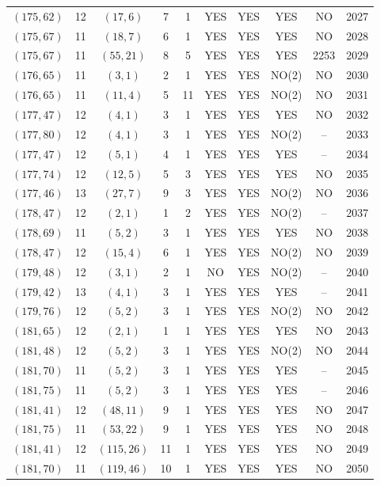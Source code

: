 \begin{longtable}{|c|c|c|c|c|c|c|c|c|c|}
$(175, 62)$ & 12 & $(17, 6)$ & 7 & 1 & YES & YES & YES & NO & 2027\\
$(175, 67)$ & 11 & $(18, 7)$ & 6 & 1 & YES & YES & YES & NO & 2028\\
$(175, 67)$ & 11 & $(55, 21)$ & 8 & 5 & YES & YES & YES & 2253 & 2029\\
$(176, 65)$ & 11 & $(3, 1)$ & 2 & 1 & YES & YES & NO(2) & NO & 2030\\
$(176, 65)$ & 11 & $(11, 4)$ & 5 & 11 & YES & YES & NO(2) & NO & 2031\\
$(177, 47)$ & 12 & $(4, 1)$ & 3 & 1 & YES & YES & YES & NO & 2032\\
$(177, 80)$ & 12 & $(4, 1)$ & 3 & 1 & YES & YES & NO(2) & -- & 2033\\
$(177, 47)$ & 12 & $(5, 1)$ & 4 & 1 & YES & YES & YES & -- & 2034\\
$(177, 74)$ & 12 & $(12, 5)$ & 5 & 3 & YES & YES & YES & NO & 2035\\
$(177, 46)$ & 13 & $(27, 7)$ & 9 & 3 & YES & YES & NO(2) & NO & 2036\\
$(178, 47)$ & 12 & $(2, 1)$ & 1 & 2 & YES & YES & NO(2) & -- & 2037\\
$(178, 69)$ & 11 & $(5, 2)$ & 3 & 1 & YES & YES & YES & NO & 2038\\
$(178, 47)$ & 12 & $(15, 4)$ & 6 & 1 & YES & YES & NO(2) & NO & 2039\\
$(179, 48)$ & 12 & $(3, 1)$ & 2 & 1 & NO & YES & NO(2) & -- & 2040\\
$(179, 42)$ & 13 & $(4, 1)$ & 3 & 1 & YES & YES & YES & -- & 2041\\
$(179, 76)$ & 12 & $(5, 2)$ & 3 & 1 & YES & YES & NO(2) & NO & 2042\\
$(181, 65)$ & 12 & $(2, 1)$ & 1 & 1 & YES & YES & YES & NO & 2043\\
$(181, 48)$ & 12 & $(5, 2)$ & 3 & 1 & YES & YES & NO(2) & NO & 2044\\
$(181, 70)$ & 11 & $(5, 2)$ & 3 & 1 & YES & YES & YES & -- & 2045\\
$(181, 75)$ & 11 & $(5, 2)$ & 3 & 1 & YES & YES & YES & -- & 2046\\
$(181, 41)$ & 12 & $(48, 11)$ & 9 & 1 & YES & YES & YES & NO & 2047\\
$(181, 75)$ & 11 & $(53, 22)$ & 9 & 1 & YES & YES & YES & NO & 2048\\
$(181, 41)$ & 12 & $(115, 26)$ & 11 & 1 & YES & YES & YES & NO & 2049\\
$(181, 70)$ & 11 & $(119, 46)$ & 10 & 1 & YES & YES & YES & NO & 2050\\

\end{longtable}
